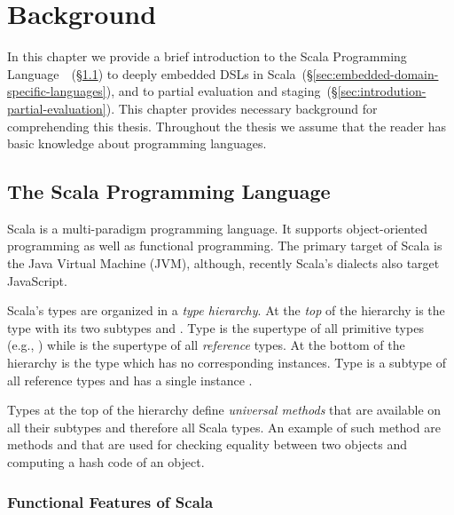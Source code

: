 \chapter{Background}
\label{ch:background}

In this chapter we provide a brief introduction to the Scala Programming Language~\cite{odersky_scala_2004}~(\S \ref{sec:scala})  to deeply embedded DSLs in Scala~(\S \ref{sec:embedded-domain-specific-languages}), and to partial evaluation and staging~(\S \ref{sec:introdution-partial-evaluation}). This chapter provides necessary background for comprehending this thesis. Throughout the thesis we assume that the reader has basic knowledge about programming languages.


\section{The Scala Programming Language}
\label{sec:scala}

Scala is a multi-paradigm programming language. It supports object-oriented
programming as well as functional programming. The primary target of Scala is the
Java Virtual Machine (JVM), although, recently Scala's dialects also target JavaScript.


 Scala's types are organized in a \emph{type hierarchy}. At the \emph{top} of the hierarchy is the  type
 with its two subtypes  and . Type  is the
 supertype of all primitive types (e.g., ) while  is the supertype
of all \emph{reference} types. At the bottom of the hierarchy is the type  which has no corresponding
 instances. Type  is a subtype of all reference types and has a single instance .

Types at the top of the hierarchy define \emph{universal methods} that are available
 on all their subtypes and therefore all Scala types. An example of such method are methods
  and  that are used for checking equality between two objects
 and computing a hash code of an object.


\subsection{Functional Features of Scala}
\label{functional-programming-features}

